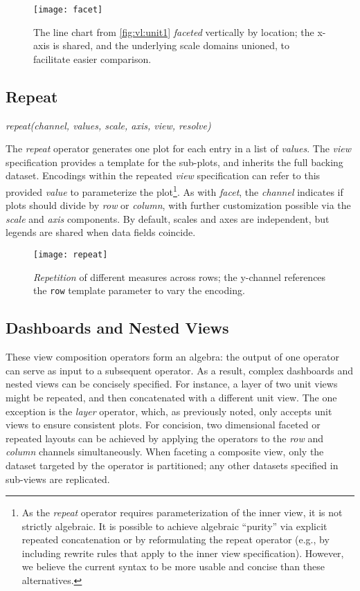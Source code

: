 \begin{figure*}[h!]
  \centering
  \texttt{[image: facet]}
  \caption{The line chart from \cref{fig:vl:unit1} \emph{faceted}
  vertically by location; the x-axis is shared, and the underlying scale domains
  unioned, to facilitate easier comparison.}
  \label{fig:vl:facet}
\end{figure*}

\subsection{Repeat}

\centerline{
  \emph{repeat(channel, values, scale, axis, view, resolve)}
}

The \emph{repeat} operator generates one plot for each entry in a list of
\emph{values}. The \emph{view} specification provides a template for the
sub-plots, and inherits the full backing dataset. Encodings within the
repeated \emph{view} specification can refer to this provided \emph{value} to
parameterize the plot\footnote{As the \emph{repeat} operator requires
parameterization of the inner view, it is not strictly algebraic. It is
possible to achieve algebraic ``purity'' via explicit repeated concatenation
or by reformulating the repeat operator (e.g., by including rewrite rules that
apply to the inner view specification). However, we believe the current syntax
to be more usable and concise than these alternatives.}. As with \emph{facet},
the \emph{channel} indicates if plots should divide by \emph{row} or
\emph{column}, with further customization possible via the \emph{scale} and
\emph{axis} components. By default, scales and axes are independent, but
legends are shared when data fields coincide.

\begin{figure*}[h!]
  \centering
  \texttt{[image: repeat]}
  \caption{\emph{Repetition} of different measures across rows; the y-channel
  references the \texttt{row} template parameter to vary the encoding.}
  \label{fig:vl:repeat}
\end{figure*}

\subsection{Dashboards and Nested Views}

These view composition operators form an algebra: the output of one operator can
serve as input to a subsequent operator. As a result, complex dashboards and
nested views can be concisely specified. For instance, a layer of two unit views
might be repeated, and then concatenated with a different unit view. The one
exception is the \emph{layer} operator, which, as previously noted, only accepts
unit views to ensure consistent plots. For concision, two dimensional faceted or
repeated layouts can be achieved by applying the operators to the \emph{row} and
\emph{column} channels simultaneously. When faceting a composite view, only the
dataset targeted by the operator is partitioned; any other datasets specified in
sub-views are replicated.
